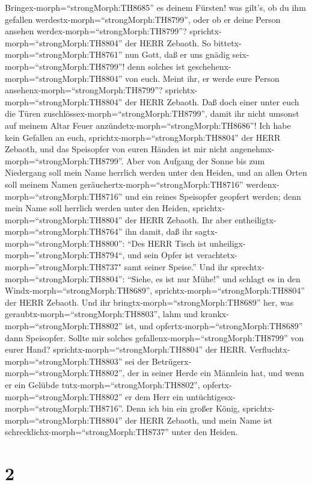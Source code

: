 Bringex-morph=``strongMorph:TH8685'' es deinem Fürsten! was gilt's, ob
du ihm gefallen werdestx-morph=``strongMorph:TH8799'', oder ob er deine
Person ansehen werdex-morph=``strongMorph:TH8799''?
sprichtx-morph=``strongMorph:TH8804'' der HERR Zebaoth.  So
bittetx-morph=``strongMorph:TH8761'' nun Gott, daß er uns gnädig
seix-morph=``strongMorph:TH8799''! denn solches ist
geschehenx-morph=``strongMorph:TH8804'' von euch. Meint ihr, er werde
eure Person ansehenx-morph=``strongMorph:TH8799''?
sprichtx-morph=``strongMorph:TH8804'' der HERR Zebaoth. 
Daß doch einer unter euch die Türen
zuschlössex-morph=``strongMorph:TH8799'', damit ihr nicht umsonst auf
meinem Altar Feuer anzündetx-morph=``strongMorph:TH8686''! Ich habe kein
Gefallen an euch, sprichtx-morph=``strongMorph:TH8804'' der HERR
Zebaoth, und das Speisopfer von euren Händen ist mir nicht
angenehmx-morph=``strongMorph:TH8799''.  Aber von Aufgang
der Sonne bis zum Niedergang soll mein Name herrlich werden unter den
Heiden, und an allen Orten soll meinem Namen
geräuchertx-morph=``strongMorph:TH8716''
werdenx-morph=``strongMorph:TH8716'' und ein reines Speisopfer geopfert
werden; denn mein Name soll herrlich werden unter den Heiden,
sprichtx-morph=``strongMorph:TH8804'' der HERR Zebaoth. 
Ihr aber entheiligtx-morph=``strongMorph:TH8764'' ihn damit, daß ihr
sagtx-morph=``strongMorph:TH8800'': ``Des HERR Tisch ist
unheiligx-morph=''strongMorph:TH8794``, und sein Opfer ist
verachtetx-morph=''strongMorph:TH8737" samt seiner Speise.''
 Und ihr sprechtx-morph=``strongMorph:TH8804'': ``Siehe, es
ist nur Mühe!'' und schlagt es in den
Windx-morph=``strongMorph:TH8689'',
sprichtx-morph=``strongMorph:TH8804'' der HERR Zebaoth. Und ihr
bringtx-morph=``strongMorph:TH8689'' her, was
geraubtx-morph=``strongMorph:TH8803'', lahm und
krankx-morph=``strongMorph:TH8802'' ist, und
opfertx-morph=``strongMorph:TH8689'' dann Speisopfer. Sollte mir solches
gefallenx-morph=``strongMorph:TH8799'' von eurer Hand?
sprichtx-morph=``strongMorph:TH8804'' der HERR. 
Verfluchtx-morph=``strongMorph:TH8803'' sei der
Betrügerx-morph=``strongMorph:TH8802'', der in seiner Herde ein Männlein
hat, und wenn er ein Gelübde tutx-morph=``strongMorph:TH8802'',
opfertx-morph=``strongMorph:TH8802'' er dem Herr ein
untüchtigesx-morph=``strongMorph:TH8716''. Denn ich bin ein großer
König, sprichtx-morph=``strongMorph:TH8804'' der HERR Zebaoth, und mein
Name ist schrecklichx-morph=``strongMorph:TH8737'' unter den Heiden.

\hypertarget{section-1}{%
\section{2}\label{section-1}}

